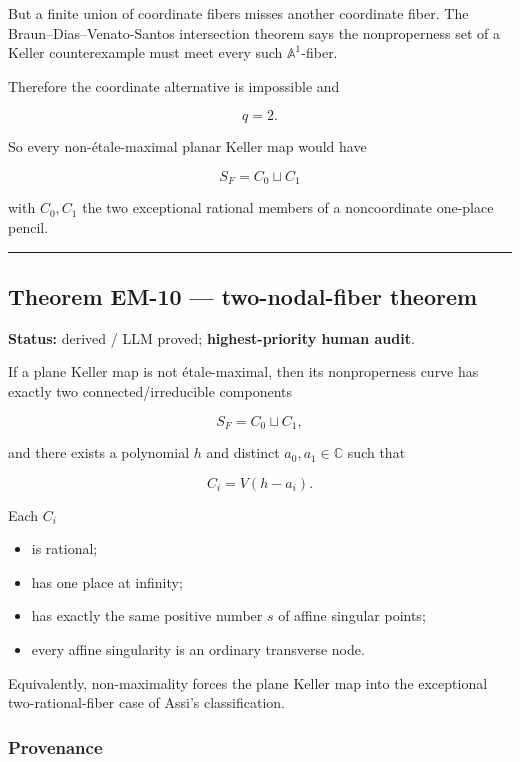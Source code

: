 But a finite union of coordinate fibers misses another coordinate fiber.
The Braun--Dias--Venato-Santos intersection theorem says the
nonproperness set of a Keller counterexample must meet every such
\(\mathbb A^1\)-fiber.

Therefore the coordinate alternative is impossible and

\[
\boxed{q=2.}
\]

So every non-étale-maximal planar Keller map would have

\[
S_F=C_0\sqcup C_1
\]

with \(C_0,C_1\) the two exceptional rational members of a noncoordinate
one-place pencil.

\begin{center}\rule{0.5\linewidth}{0.5pt}\end{center}

\subsection{Theorem EM-10 --- two-nodal-fiber
theorem}\label{theorem-em-10-two-nodal-fiber-theorem}

\textbf{Status:} derived / LLM proved; \textbf{highest-priority human
audit}.

If a plane Keller map is not étale-maximal, then its nonproperness curve
has exactly two connected/irreducible components

\[
\boxed{
S_F=C_0\sqcup C_1,
}
\]

and there exists a polynomial \(h\) and distinct \(a_0,a_1\in\mathbb C\)
such that

\[
C_i=V(h-a_i).
\]

Each \(C_i\)

\begin{itemize}
\tightlist
\item
  is rational;
\item
  has one place at infinity;
\item
  has exactly the same positive number \(s\) of affine singular points;
\item
  every affine singularity is an ordinary transverse node.
\end{itemize}

Equivalently, non-maximality forces the plane Keller map into the
exceptional two-rational-fiber case of Assi's classification.

\subsubsection{Provenance}\label{provenance}

